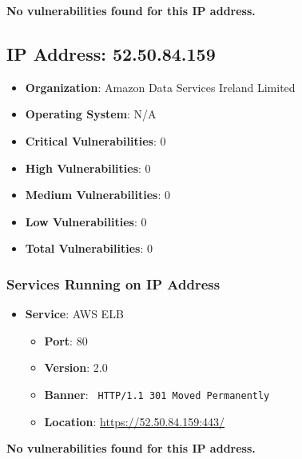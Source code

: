 \documentclass{article}
\begin{document}
\textbf{No vulnerabilities found for this IP address.}




\clearpage



\subsection*{IP Address: 52.50.84.159}

\begin{itemize}
    \item \textbf{Organization}: Amazon Data Services Ireland Limited
    \item \textbf{Operating System}:  N/A 
    \item \textbf{Critical Vulnerabilities}: 0
    \item \textbf{High Vulnerabilities}: 0
    \item \textbf{Medium Vulnerabilities}: 0
    \item \textbf{Low Vulnerabilities}: 0
    \item \textbf{Total Vulnerabilities}: 0
\end{itemize}

\subsubsection*{Services Running on IP Address}

\begin{itemize}
    
        \item \textbf{Service}: AWS ELB
        \begin{itemize}
            \item \textbf{Port}: 80
            \item \textbf{Version}:  2.0 
            \item \textbf{Banner}: \texttt{
                HTTP/1.1 301 Moved Permanently
            }
            \item \textbf{Location}: \href{ https://52.50.84.159:443/ }{ https://52.50.84.159:443/ }
        \end{itemize}
    
\end{itemize}


\textbf{No vulnerabilities found for this IP address.}




\clearpage
\end{document}
